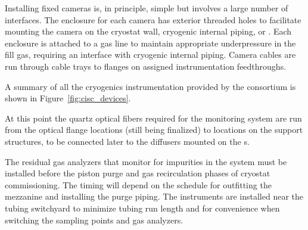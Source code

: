 Installing fixed cameras is, in principle, simple but involves a large number of interfaces. The enclosure for each camera has exterior threaded holes to facilitate mounting the camera on the cryostat wall, cryogenic internal piping, or . Each enclosure is attached to a gas line to maintain appropriate underpressure in the fill gas, requiring an interface with cryogenic internal piping. Camera cables are run through cable trays to flanges on assigned instrumentation feedthroughs. 


A summary of all the cryogenics instrumentation provided by the  consortium is shown in Figure~\ref{fig:cisc_devices}. 

At this point the quartz optical fibers required for the  monitoring system are   run from the optical flange locations (still being finalized) to locations on the  support structures, to be connected later to the diffusers mounted on the s.

The residual gas analyzers that monitor for impurities in the  system must be installed before the piston purge and gas recirculation phases of cryostat commissioning.  The  timing will depend on the schedule for outfitting the mezzanine and installing the   purge piping. The instruments are installed near the tubing switchyard to minimize tubing run length and for convenience when switching the sampling points and gas analyzers. 

